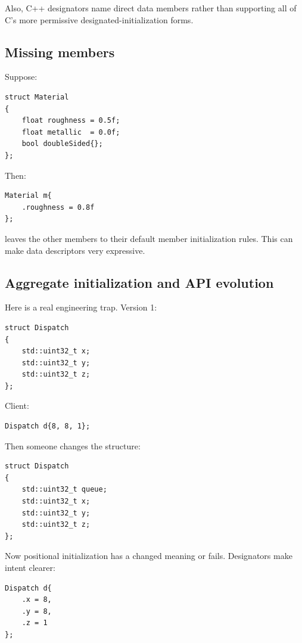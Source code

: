 Also, C++ designators name direct data members rather than supporting all of C's more permissive designated-initialization forms.

\subsection{Missing members}\label{05-engine-i-ch003-missing-members}

Suppose:

\begin{verbatim}
struct Material
{
    float roughness = 0.5f;
    float metallic  = 0.0f;
    bool doubleSided{};
};
\end{verbatim}

Then:

\begin{verbatim}
Material m{
    .roughness = 0.8f
};
\end{verbatim}

leaves the other members to their default member initialization rules. This can make data descriptors very expressive.

\subsection{Aggregate initialization and API evolution}\label{05-engine-i-ch003-aggregate-initialization-and-api-evolution}

Here is a real engineering trap. Version 1:

\begin{verbatim}
struct Dispatch
{
    std::uint32_t x;
    std::uint32_t y;
    std::uint32_t z;
};
\end{verbatim}

Client:

\begin{verbatim}
Dispatch d{8, 8, 1};
\end{verbatim}

Then someone changes the structure:

\begin{verbatim}
struct Dispatch
{
    std::uint32_t queue;
    std::uint32_t x;
    std::uint32_t y;
    std::uint32_t z;
};
\end{verbatim}

Now positional initialization has a changed meaning or fails. Designators make intent clearer:

\begin{verbatim}
Dispatch d{
    .x = 8,
    .y = 8,
    .z = 1
};
\end{verbatim}

